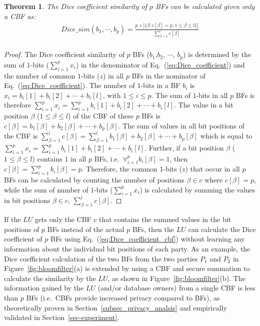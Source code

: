 \documentclass{sig-alternate}
\newtheorem{theorem}{Theorem}[section]
\begin{document}
\begin{theorem}
The Dice coefficient similarity of $p$ BFs can be calculated given
only a CBF as:
\begin{eqnarray}
\label{eq:Dice_coefficient_cbf} 
Dice\_sim (b_1, \cdots, b_p) = \frac{p \times |\{\beta: c[\beta] = p, 1 \le \beta \le l\}|}{\sum_{\beta=1}^{l} c[\beta]} \nonumber
\\
\end{eqnarray}
\end{theorem}

\begin{proof}
The Dice coefficient similarity of $p$ BFs ($b_1$,$b_2$, $\cdots$, $b_p$) is determined by the sum of $1$-bits ($\sum_{i=1}^p x_i$) in the denominator of Eq.~(\ref{eq:Dice_coefficient}) and the number of common $1$-bits ($z$) in all $p$ BFs in the nominator of Eq.~(\ref{eq:Dice_coefficient}).
The number of $1$-bits in a BF $b_i$ is $x_i = b_i[1] + b_i[2] + \cdots + b_i[l]$, with $1 \le i \le p$. The sum of $1$-bits in all $p$ BFs is therefore $\sum_{i=1}^p x_i = \sum_{i=1}^p b_i[1] + b_i[2] + \cdots + b_i[l]$. The value in a bit position $\beta$ ($1 \le \beta \le l$) of the CBF of these $p$ BFs is $c[\beta] = b_1[\beta] + b_2[\beta] + \cdots + b_p[\beta]$. The sum of values in all bit positions of the CBF is $\sum_{\beta=1}^{l} c[\beta] = \sum_{\beta=1}^{l} b_1[\beta] + b_2[\beta] + \cdots + b_p[\beta]$ which is equal to $\sum_{i=1}^p x_i = \sum_{i=1}^p b_i[1] + b_i[2] + \cdots + b_i[l]$. 
Further, if a bit position $\beta$ ($1 \le \beta \le l$) contains $1$ in all $p$ BFs, i.e.\ $\forall_{i=1}^p b_i[\beta] = 1$, then $c[\beta] = \sum_{i=1}^p b_i[\beta] = p$. Therefore, the common $1$-bits ($z$) that occur in all $p$ BFs can be calculated by counting the number of positions $\beta \in c$ where $c[\beta] = p$, while the sum of number of $1$-bits ($\sum_{i=1}^p x_i$) is calculated by summing the values in bit positions $\beta \in c$, $\sum_{\beta=1}^l c[\beta]$.
\end{proof}

If the $LU$ gets only the CBF $c$
that contains the summed values in the
bit positions of $p$ BFs instead of the actual $p$ BFs, then
the $LU$ can calculate the Dice coefficient of $p$ BFs
using Eq.~(\ref{eq:Dice_coefficient_cbf}) without
learning any information about the individual bit positions
of each party. 
As an example, the Dice coefficient
calculation of the two BFs from the 
two parties $P_1$ and $P_2$ in Figure~\ref{fig:bloomfilter}(a)
is extended by
using a CBF and secure summation 
to calculate the similarity 
by the $LU$, as shown
in Figure~\ref{fig:bloomfilter}(b). 
The information gained by the $LU$ (and/or database owners) 
from a single CBF is less than $p$ BFs
(i.e.\ CBFs provide increased privacy compared to BFs), as
theoretically proven in Section~\ref{subsec_privacy_analsis} and empirically
validated in Section~\ref{sec-experiment}.
\end{document}

